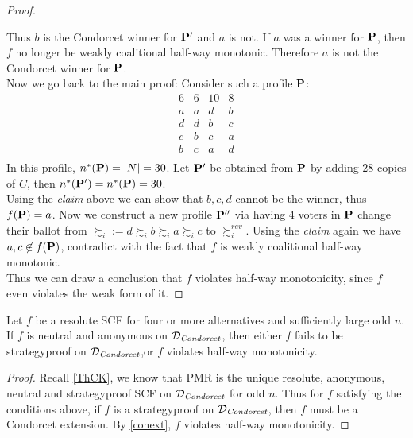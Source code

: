 \begin{proof}
\begin{itemize}
    \end{itemize}
    Thus $b$ is the Condorcet winner for $\mathbf{P}'$ and $a$ is not. If $a$ was a winner for $\mathbf{P}$, then $f$ no longer be weakly coalitional half-way monotonic. Therefore $a$ is not the Condorcet winner for $\mathbf{P}$.\\
    Now we go back to the main proof: Consider such a profile $\mathbf{P}$:
    $$\begin{array}{cccc}
        6 & 6 & 10 & 8\\
        \hline
        a & a & d & b \\
        d & d & b & c \\
        c & b & c & a \\
        b & c & a & d \\
    \end{array}$$
    In this profile, $n^\ast (\mathbf{P}) = |N| = 30$. Let $\mathbf{P}'$ be obtained from $\mathbf{P}$ by adding 28 copies of $C$, then $n^\ast (\mathbf{P}') = n^\ast (\mathbf{P}) = 30$.\\
    Using the \emph{claim} above we can show that $b,c,d$ cannot be the winner, thus $f(\mathbf{P}) = a$. Now we construct a new profile $\mathbf{P}''$ via having 4 voters in $\mathbf{P}$ change their ballot from $\succsim_i := d \succsim_i b \succsim_i a \succsim_i c$ to $\succsim^{rev}_i$. Using the \emph{claim} again we have $a,c \not \in f(\mathbf{P})$, contradict with the fact that $f$ is weakly coalitional half-way monotonic.\\
    Thus we can draw a conclusion that $f$ violates half-way monotonicity, since $f$ even violates the weak form of it.
\end{proof}

\begin{corollary}
    Let $f$ be a resolute SCF for four or more alternatives and sufficiently large odd $n$. If $f$ is neutral and anonymous on $\mathcal{D}_\textit{Condorcet}$, then either $f$ fails to be strategyproof on $\mathcal{D}_\textit{Condorcet}$,or $f$ violates half-way monotonicity.
\end{corollary}

\begin{proof}
    Recall \cref{ThCK}, we know that PMR is the unique resolute, anonymous, neutral and strategyproof SCF on $\mathcal{D}_\textit{Condorcet}$ for odd $n$. Thus for $f$ satisfying the conditions above, if $f$ is a strategyproof on $\mathcal{D}_\textit{Condorcet}$, then $f$ must be a Condorcet extension. By \cref{conext}, $f$ violates half-way monotonicity.
\end{proof}



